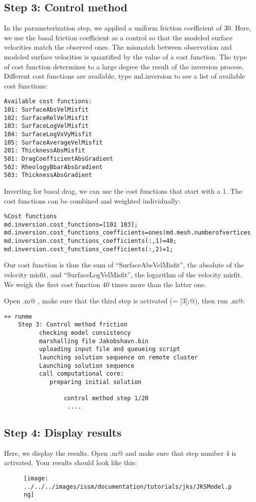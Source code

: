 \subsection{Step 3: Control method}
In the parameterization step, we applied a uniform friction coefficient of 30. Here, we use the basal friction coefficient as a control so that the modeled surface velocities
match the observed ones. The mismatch between observation and modeled surface velocities is quantified by the value of a
cost function. The type of cost function determines to a large degree the result of the inversion process. Different cost functions are available, type md.inversion to see a list of available cost functions:
\begin{verbatim}Available cost functions:
101: SurfaceAbsVelMisfit
102: SurfaceRelVelMisfit
103: SurfaceLogVelMisfit
104: SurfaceLogVxVyMisfit
105: SurfaceAverageVelMisfit
201: ThicknessAbsMisfit
501: DragCoefficientAbsGradient
502: RheologyBbarAbsGradient
503: ThicknessAbsGradient\end{verbatim}
Inverting for basal drag, we can use the cost functions that start with a 1. The cost functions can be combined and weighted individually:
\begin{verbatim}%Cost functions
md.inversion.cost_functions=[101 103];
md.inversion.cost_functions_coefficients=ones(md.mesh.numberofvertices,2);
md.inversion.cost_functions_coefficients(:,1)=40;
md.inversion.cost_functions_coefficients(:,2)=1;\end{verbatim}
Our cost function is thus the sum of ``SurfaceAbsVelMisfit'', the absolute of the velocity misfit, and ``SurfaceLogVelMisfit'', the logarithm of the velocity misfit. We weigh the first cost function 40 times more than the latter one.

Open \verb@runme.m@ , make sure that the third step is activated (\verb@steps = [3];@), then run \verb@runme.m@:
\begin{verbatim}>> runme
	Step 3: Control method friction
		  checking model consistency
		  marshalling file Jakobshavn.bin
		  uploading input file and queueing script
		  launching solution sequence on remote cluster
		  Launching solution sequence
		  call computational core:
		     preparing initial solution

			     control method step 1/20
				  ....\end{verbatim}

\subsection{Step 4: Display results}
Here, we display the results. Open \verb@runme.m@ and make sure that step number 4 is activated. Your results should look like this:
\begin{figure}[H]
	\begin{center}
		\texttt{[image: ../../../images/issm/documentation/tutorials/jks/JKSModel.png]}
	\end{center}
\end{figure}
